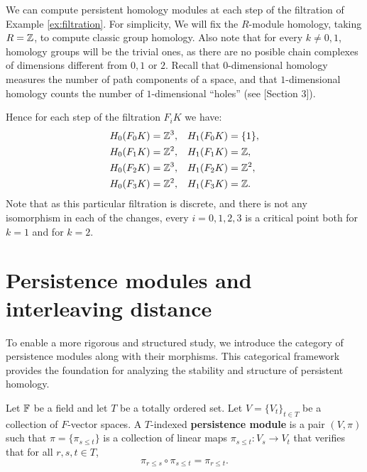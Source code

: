 \begin{example} \label{ex:persistent groups}
    We can compute persistent homology modules at each step of the filtration of Example \ref{ex:filtration}. For simplicity, We will fix the $R$-module homology, taking $R = \mathbb Z $, to compute classic group homology. Also note that for every $ k \neq 0, 1 $, homology groups will be the trivial ones, as there are no posible chain complexes of dimensions different from $ 0, 1 $ or $ 2 $. Recall that $0$-dimensional homology measures the number of path components of a space, and that $1$-dimensional homology counts the number of $1$-dimensional ``holes'' (see \cite{nina}[Section 3]).
    
    Hence for each step of the filtration $ F_i K $ we have:
    \begin{align}
        H_0(F_0 K) &= \mathbb Z^3,  & H_1(F_0 K) &= \{1\}, \\
        H_0(F_1 K) &= \mathbb Z^2,  & H_1(F_1 K) &= \mathbb Z, \\
        H_0(F_2 K) &= \mathbb Z^3,  & H_1(F_2 K) &= \mathbb Z^2, \\
        H_0(F_3 K) &= \mathbb Z^2,  & H_1(F_3 K) &= \mathbb Z.
    \end{align}
    Note that as this particular filtration is discrete, and there is not any isomorphism in each of the changes, every $ i = 0, 1, 2, 3 $ is a critical point both for $ k = 1 $ and for $ k = 2 $.
\end{example}

\section{Persistence modules and interleaving distance} \label{sec:preliminaries-modules}

To enable a more rigorous and structured study, we introduce the category of persistence modules along with their morphisms. This categorical framework provides the foundation for analyzing the stability and structure of persistent homology.

\begin{definition}
    Let $\mathbb F$ be a field and let $T$ be a totally ordered set. Let $ V = \{V_t\}_{t \in T} $ be a collection of $F$-vector spaces. A $T$-indexed {\bf persistence module} is a pair $ (V, \pi) $ such that $ \pi = \{ \pi_{s \leq t} \} $ is a collection of linear maps $ \pi_{s \leq t}\colon V_s \rightarrow V_t $ that verifies that for all $ r, s, t \in T $,
    \begin{equation}
        \pi_{r \leq s} \circ \pi_{s \leq t} = \pi_{r \leq t}.
    \end{equation}
\end{definition}

